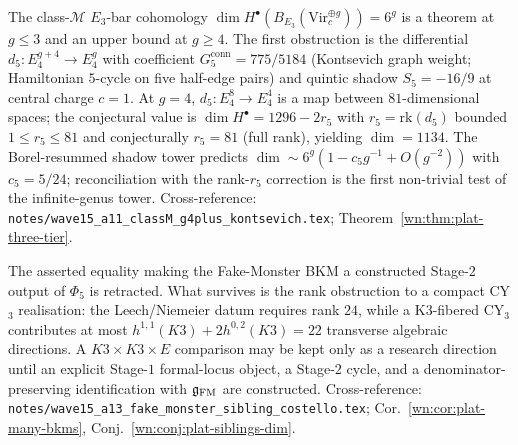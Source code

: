 \begin{conjecture}\ClaimStatusConjectured
\label{wn:conj:plat-w15-classM-g4}
The class-$\mathcal{M}$ $E_3$-bar cohomology
$\dim H^\bullet(B_{E_3}(\mathrm{Vir}_c^{\oplus g})) = 6^g$ is a
theorem at $g \leq 3$ and an upper bound at $g \geq 4$. The first
obstruction is the differential
$d_5 \colon E_4^{g+4} \to E_4^g$ with coefficient
$G_5^{\mathrm{conn}} = 775/5184$ (Kontsevich graph weight;
Hamiltonian $5$-cycle on five half-edge pairs) and quintic shadow
$S_5 = -16/9$ at central charge $c = 1$. At $g = 4$,
$d_5 : E_4^8 \to E_4^4$ is a map between $81$-dimensional spaces;
the conjectural value is $\dim H^\bullet = 1296 - 2 r_5$ with
$r_5 = \mathrm{rk}(d_5)$ bounded $1 \leq r_5 \leq 81$ and
conjecturally $r_5 = 81$ (full rank), yielding $\dim = 1134$. The
Borel-resummed shadow tower predicts
$\dim \sim 6^g (1 - c_5 g^{-1} + O(g^{-2}))$ with $c_5 = 5/24$;
reconciliation with the rank-$r_5$ correction is the first
non-trivial test of the infinite-genus tower.
Cross-reference: \texttt{notes/wave15\_a11\_classM\_g4plus\_kontsevich.tex};
Theorem~\ref{wn:thm:plat-three-tier}.
\end{conjecture}

\begin{theorem}\ClaimStatusRetracted
\label{wn:thm:plat-w15-fake-monster-d5}
The asserted equality making the Fake-Monster BKM a constructed
Stage-$2$ output of $\Phi_5$ is retracted.  What survives is the rank
obstruction to a compact CY$_3$ realisation: the Leech/Niemeier datum
requires rank $24$, while a K3-fibered CY$_3$ contributes at most
$h^{1,1}(K3)+2h^{0,2}(K3)=22$ transverse algebraic directions.  A
$K3\times K3\times E$ comparison may be kept only as a research
direction until an explicit Stage-$1$ formal-locus object, a Stage-$2$
cycle, and a denominator-preserving identification with
$\mathfrak{g}_{\mathrm{FM}}$ are constructed.
Cross-reference: \texttt{notes/wave15\_a13\_fake\_monster\_sibling\_costello.tex};
Cor.~\ref{wn:cor:plat-many-bkms},
Conj.~\ref{wn:conj:plat-siblings-dim}.
\end{theorem}

